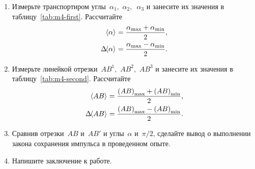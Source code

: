 \documentclass[a4paper, 12pt]{extarticle}
\begin{document}
\begin{enumerate}
      \item Измерьте транспортиром углы~$\alpha_1,$ $\alpha_2,$~$\alpha_3$ и занесите их значения в таблицу~\ref{tab:m4-first}.
           Рассчитайте
           \begin{align}
           \label{eq:m4-value-alpha}
           \hspace{-3pt}\left<\alpha\right>\hspace{-3pt}\ &= \frac{\alpha_{\max} + \alpha_{\min}}{2}, \\
           \label{eq:m4-value-dalpha}
           \Delta\hspace{-3pt}\left<\alpha\right>\hspace{-3pt}\ &= \frac{\alpha_{\max} - \alpha_{\min}}{2}.
           \end{align}

      \item Измерьте линейкой отрезки~$AB^1,$ $AB^2$,~$AB^3$ и занесите их значения в таблицу~\ref{tab:m4-second}.
           Рассчитайте
          \begin{align}
          \label{eq:m4-value-AB}
          \hspace{-3pt}\left<AB\right>\hspace{-3pt}\ &= \frac{\left(AB\right)_{\max} + \left(AB\right)_{\min}}{2}, \\
          \label{eq:m4-value-deltaAB}
          \Delta \hspace{-3pt}\left<AB\right>\hspace{-3pt}\ &= \frac{\left(AB\right)_{\max} - \left(AB\right)_{\min}}{2}.
          \end{align}
          \item %
           Сравнив отрезки~$AB$ и~$AB'$ и углы~$\alpha$ и~$\pi/2$, сделайте вывод о выполнении закона сохранения импульса в проведенном опыте. %
      \item Напишите заключение к работе.
\end{enumerate}
\end{document}
